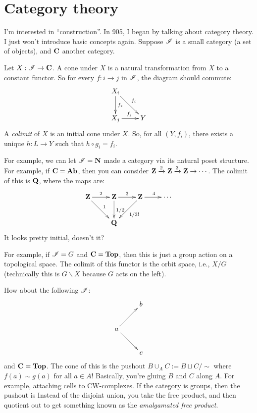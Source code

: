 \section{Category theory}
I'm interested in ``construction''. In 905, I began by talking about category theory. I just won't introduce basic concepts again. Suppose $\mathscr I$ is a small category (a set of objects), and $\mathbf C$ another category.
\begin{definition}
    Let $X:\mathscr I\to\mathbf C$. A cone under $X$ is a natural transformation from $X$ to a constant functor. So for every $f:i\to j$ in $\mathscr I$, the diagram should commute:
    \begin{equation*}
	\xymatrix{
	    X_i\ar[d]^{f_\ast}\ar[dr]^{f_i} & \\
	    X_j\ar[r]^{f_j} & Y
	    }
    \end{equation*}
    A \emph{colimit} of $X$ is an initial cone under $X$. So, for all $(Y,f_i)$, there exists a unique $h:L\to Y$ such that $h\circ g_i = f_i$.
\end{definition}
For example, we can let $\mathscr I = \mathbf{N}$ made a category via its natural poset structure. For example, if $\mathbf C = \mathbf{Ab}$, then you can consider $\mathbf Z\xrightarrow{2}\mathbf Z\xrightarrow{3}\mathbf Z\to\cdots$. The colimit of this is $\mathbf Q$, where the maps are:
\begin{equation*}
    \xymatrix{
	\Z\ar[r]^2\ar[dr]^1 & \Z\ar[r]^3\ar[d]^{1/2} & \Z\ar[r]^4\ar[dl]^{1/3!} & \cdots\\
	& \QQ & &
    }
\end{equation*}
It looks pretty initial, doesn't it?

For example, if $\mathscr I = G$ and $\mathbf C=\mathbf{Top}$, then this is just a group action on a topological space. The colimit of this functor is the orbit space, i.e., $X/G$ (technically this is $G\backslash X$ because $G$ acts on the left).

How about the following $\mathscr I$:
\begin{equation*}
    \xymatrix{
	& b\\
	a\ar[ur]\ar[dr] & \\
	& c
    }
\end{equation*}
and $\mathbf C=\mathbf{Top}$. The cone of this is the pushout $B\cup_A C:= B\sqcup C/\sim$ where $f(a)\sim g(a)$ for all $a\in A$! Basically, you're gluing $B$ and $C$ along $A$. For example, attaching cells to CW-complexes. If the category is groups, then the pushout is Instead of the disjoint union, you take the free product, and then quotient out to get something known as the \emph{amalgamated free product}.

